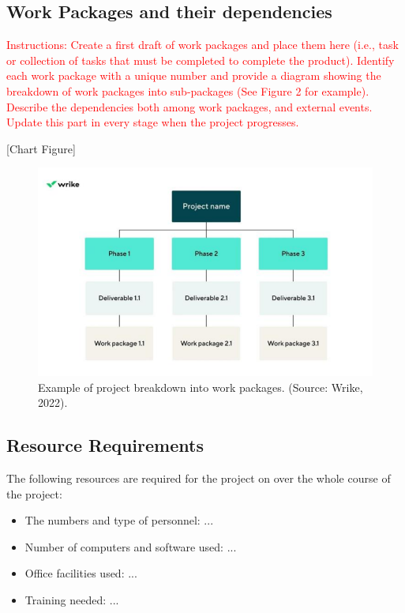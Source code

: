 \documentclass{article}
\begin{document}
\subsection{Work Packages and their dependencies}
\textcolor{red}{Instructions: Create a first draft of work packages and place them here (i.e., task
or collection of tasks that must be completed to complete the product).
Identify each work package with a unique number and provide a diagram showing
the breakdown of work packages into sub-packages (See Figure 2 for example).
Describe the dependencies both among work packages, and external events.
Update this part in every stage when the project progresses.}

[Chart Figure]

\begin{figure}[h]
  \centering
  \includegraphics[width=1.0\textwidth]{wrike_2022.png}
  \caption{  Example of project breakdown into work packages. (Source: Wrike,
2022). }
  \label{harrin}
\end{figure}

\subsection{Resource Requirements}
The following resources are required for the project on over the whole course of
the project:
{\color{red}
\begin{itemize}
\item The numbers and type of personnel: ...
\item Number of computers and software used: ...
\item Office facilities used: ...
\item Training needed: ...
\end{itemize}
}
\end{document}
